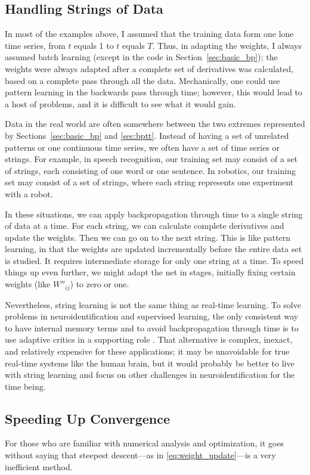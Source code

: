 \documentclass[journal]{IEEEtran} %
\begin{document}
\subsection{Handling Strings of Data}
In most of the examples above, I assumed that the training data form one lone time series, from $t$ equals 1 to $t$ equals $T$. Thus, in adapting the weights, I always assumed batch learning (except in the code in Section~\ref{sec:basic_bp}); the weights were always adapted after a complete set of derivatives was calculated, based on a complete pass through all the data. Mechanically, one could use pattern learning in the backwards pass through time; however, this would lead to a host of problems, and it is difficult to see what it would gain.

Data in the real world are often somewhere between the two extremes represented by Sections~\ref{sec:basic_bp} and \ref{sec:bptt}. Instead of having a set of unrelated patterns or one continuous time series, we often have a set of time series or strings. For example, in speech recognition, our training set may consist of a set of strings, each consisting of one word or one sentence. In robotics, our training set may consist of a set of strings, where each string represents one experiment with a robot.

In these situations, we can apply backpropagation through time to a single string of data at a time. For each string, we can calculate complete derivatives and update the weights. Then we can go on to the next string. This is like pattern learning, in that the weights are updated incrementally before the entire data set is studied. It requires intermediate storage for only one string at a time. To speed things up even further, we might adapt the net in stages, initially fixing certain weights (like $W''_{ij}$) to zero or one.

Nevertheless, string learning is not the same thing as real-time learning. To solve problems in neuroidentification and supervised learning, the only consistent way to have internal memory terms and to avoid backpropagation through time is to use adaptive critics in a supporting role \cite{Werbos:1988}. That alternative is complex, inexact, and relatively expensive for these applications; it may be unavoidable for true real-time systems like the human brain, but it would probably be better to live with string learning and focus on other challenges in neuroidentification for the time being.

\subsection{Speeding Up Convergence}
For those who are familiar with numerical analysis and optimization, it goes without saying that steepest descent---as in \eqref{eq:weight_update}---is a very inefficient method.
\end{document}
